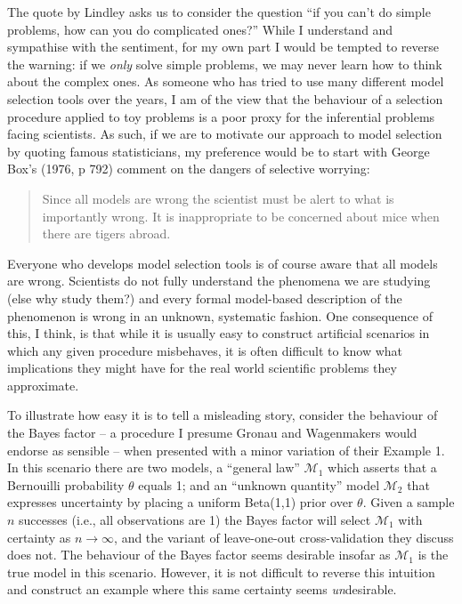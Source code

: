 \documentclass[doc]{apa6}
\theoremstyle{definition}
\theoremstyle{definition}
\theoremstyle{definition}
\theoremstyle{remark}
\begin{document}
The quote by Lindley asks us to consider the question \enquote{if you
can't do simple problems, how can you do complicated ones?} While I
understand and sympathise with the sentiment, for my own part I would be
tempted to reverse the warning: if we \emph{only} solve simple problems,
we may never learn how to think about the complex ones. As someone who
has tried to use many different model selection tools over the years, I
am of the view that the behaviour of a selection procedure applied to
toy problems is a poor proxy for the inferential problems facing
scientists. As such, if we are to motivate our approach to model
selection by quoting famous statisticians, my preference would be to
start with George Box's (1976, p 792) comment on the dangers of
selective worrying:

\begin{quote}
Since all models are wrong the scientist must be alert to what is
importantly wrong. It is inappropriate to be concerned about mice when
there are tigers abroad.
\end{quote}

\noindent
Everyone who develops model selection tools is of course aware that all
models are wrong. Scientists do not fully understand the phenomena we
are studying (else why study them?) and every formal model-based
description of the phenomenon is wrong in an unknown, systematic
fashion. One consequence of this, I think, is that while it is usually
easy to construct artificial scenarios in which any given procedure
misbehaves, it is often difficult to know what implications they might
have for the real world scientific problems they approximate.

To illustrate how easy it is to tell a misleading story, consider the
behaviour of the Bayes factor -- a procedure I presume Gronau and
Wagenmakers would endorse as sensible -- when presented with a minor
variation of their Example 1. In this scenario there are two models, a
\enquote{general law} \(\mathcal{M}_1\) which asserts that a Bernouilli
probability \(\theta\) equals 1; and an \enquote{unknown quantity} model
\(\mathcal{M}_2\) that expresses uncertainty by placing a uniform
Beta(1,1) prior over \(\theta\). Given a sample \(n\) successes (i.e.,
all observations are 1) the Bayes factor will select \(\mathcal{M}_1\)
with certainty as \(n \rightarrow \infty\), and the variant of
leave-one-out cross-validation they discuss does not. The behaviour of
the Bayes factor seems desirable insofar as \(\mathcal{M}_1\) is the
true model in this scenario. However, it is not difficult to reverse
this intuition and construct an example where this same certainty seems
\emph{un}desirable.
\end{document}
